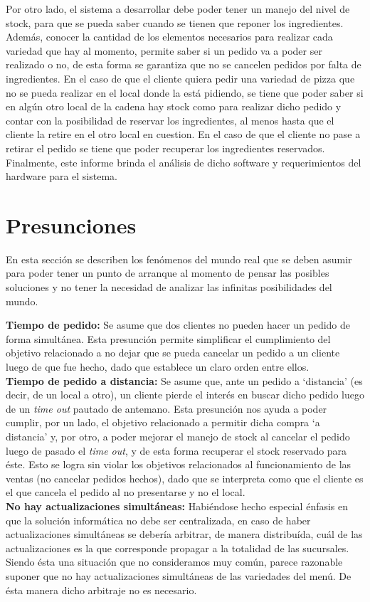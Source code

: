 \documentclass[a4paper,10pt]{article}
\begin{document}
Por otro lado, el sistema a desarrollar debe poder tener un manejo del nivel de stock, para que se pueda saber cuando se tienen que reponer los ingredientes. Adem\'as, conocer la cantidad de los elementos necesarios para realizar cada variedad que hay al momento, permite saber si un pedido va a poder ser realizado o no, de esta forma se garantiza que no se cancelen pedidos por falta de ingredientes. En el caso de que el cliente quiera pedir una variedad de pizza que no se pueda realizar en el local donde la est\'a pidiendo, se tiene que poder saber si en alg\'un otro local de la cadena hay stock como para realizar dicho pedido y contar con la posibilidad de reservar los ingredientes, al menos hasta que el cliente la retire en el otro local en cuestion. En el caso de que el cliente no pase a retirar el pedido se tiene que poder recuperar los ingredientes reservados. Finalmente, este informe brinda el an\'alisis de dicho software y requerimientos del hardware para el sistema.


\newpage
\section*{Presunciones}
En esta secci\'on se describen los fen\'omenos del mundo real que se deben asumir para poder tener un punto de arranque al momento
de pensar las posibles soluciones y no tener la necesidad de analizar las infinitas posibilidades del mundo.

\noindent
\textbf{Tiempo de pedido:} Se asume que dos clientes no pueden hacer un pedido de forma simultánea. Esta presunción permite simplificar el cumplimiento del objetivo relacionado a no dejar que se pueda cancelar un pedido a un cliente luego de que fue hecho, dado que establece un claro orden entre ellos. \\
\textbf{Tiempo de pedido a distancia:} Se asume que, ante un pedido a `distancia' (es decir, de un local a otro), un cliente pierde el interés en buscar dicho pedido luego de un \textit{time out} pautado de antemano. Esta presunción nos ayuda a poder cumplir, por un lado, el objetivo relacionado a permitir dicha compra `a distancia' y, por otro, a poder mejorar el manejo de stock al cancelar el pedido luego de pasado el \textit{time out}, y de esta forma recuperar el stock reservado para éste. Esto se logra sin violar los objetivos relacionados al funcionamiento de las ventas (no cancelar pedidos hechos), dado que se interpreta como que el cliente es el que cancela el pedido al no presentarse y no el local.\\
\textbf{No hay actualizaciones simultáneas:} Habiéndose hecho especial énfasis en que la solución informática no debe ser centralizada, en caso de haber actualizaciones simultáneas se debería arbitrar, de manera distribuída, cuál de las actualizaciones es la que corresponde propagar a la totalidad de las sucursales. Siendo ésta una situación que no consideramos muy común, parece razonable suponer que no hay actualizaciones simultáneas de las variedades del menú. De ésta manera dicho arbitraje no es necesario. \\ 
\newpage
\end{document}
